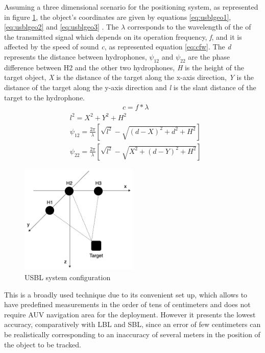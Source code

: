 Assuming a three dimensional scenario for the positioning system, as represented in figure \ref{fig:usblgeo}, the object's coordinates are given by equations \ref{eq:usblgeo1}, \ref{eq:usblgeo2} and \ref{eq:usblgeo3} \cite{usbl-new}. The $\lambda$ corresponds to the wavelength of the of the transmitted signal which depends on its operation frequency, \textit{f}, and it is affected by the speed of sound \textit{c}, as represented equation \ref{eq:cfw}.
The \textit{d} represents the distance between hydrophones, $\psi_{12}$ and $\psi_{22}$ are the phase difference between H2 and the other two hydrophones, \textit{H} is the height of the target object, \textit{X} is the distance of the target along the x-axis direction, \textit{Y} is the distance of the target along the y-axis direction and \textit{l} is the slant distance of the target to the hydrophone.
\begin{eqnarray}
& c = f * \lambda
\label{eq:cfw}
\end{eqnarray}
\begin{eqnarray}
& l^2 = X^2 + Y^2 + H^2 
\label{eq:usblgeo1}\\
& \psi_{12} = \frac{2\pi}{\lambda}[\sqrt{l^2} - \sqrt{(d-X)^2 + d^2 + H^2}]
\label{eq:usblgeo2}\\
& \psi_{22} = \frac{2\pi}{\lambda}[\sqrt{l^2} - \sqrt{X^2 + (d-Y)^2 + H^2}]
\label{eq:usblgeo3}
\end{eqnarray}

\begin{figure}[!htbp]
	\centering
	\includegraphics[width=0.5\textwidth]{figures/usbl-config}
	\caption{USBL system configuration}
	\label{fig:usblgeo}
\end{figure}

This is a broadly used technique due to its convenient set up, which allows to have predefined measurements in the order of tens of centimeters and does not require AUV navigation area for the deployment. However it presents the lowest accuracy, comparatively with LBL and SBL, since an error of few centimeters can be realistically corresponding to an inaccuracy of several meters in the position of the object to be tracked.

